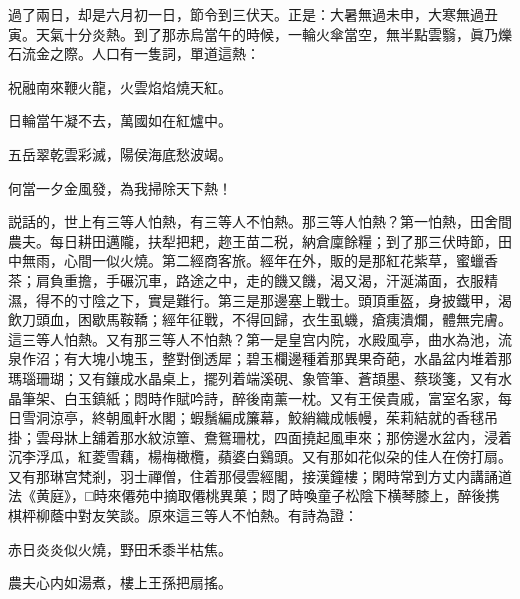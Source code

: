 過了兩日，却是六月初一日，節令到三伏天。正是：大暑無過未申，大寒無過丑寅。天氣十分炎熱。到了那赤烏當午的時候，一輪火傘當空，無半點雲翳，眞乃爍石流金之際。人口有一隻詞，單道這熱：

\begin{myquote}
祝融南來鞭火龍，火雲焰焰燒天紅。

日輪當午凝不去，萬國如在紅爐中。

五岳翠乾雲彩滅，陽侯海底愁波竭。

何當一夕金風發，為我掃除天下熱！
\end{myquote}

説話的，世上有三等人怕熱，有三等人不怕熱。那三等人怕熱？第一怕熱，田舍間農夫。每日耕田邁隴，扶犁把耙，趂王苗二税，納倉廩餘糧；到了那三伏時節，田中無雨，心間一似火燒。第二經商客旅。經年在外，販的是那紅花紫草，蜜蠟香茶；肩負重擔，手碾沉車，路途之中，走的饑又饑，渴又渴，汗涎滿面，衣服精濕，得不的寸陰之下，實是難行。第三是那邊塞上戰士。頭頂重盔，身披鐵甲，渴飲刀頭血，困歇馬鞍鞽；經年征戰，不得回歸，衣生虱蟣，瘡痍潰爛，體無完膚。這三等人怕熱。又有那三等人不怕熱？第一是皇宫内院，水殿風亭，曲水為池，流泉作沼；有大塊小塊玉，整對倒透犀；碧玉欄邊種着那異果奇葩，水晶盆内堆着那瑪瑙珊瑚；又有鑲成水晶桌上，擺列着端溪硯、象管筆、蒼頡墨、蔡琰箋，又有水晶筆架、白玉鎮紙；悶時作賦吟詩，醉後南薰一枕。又有王侯貴戚，富室名家，每日雪洞涼亭，終朝風軒水閣；蝦鬚編成簾幕，鮫綃織成帳幔，茱莉結就的香毬吊掛；雲母牀上舖着那水紋涼簟、鴦鴛珊枕，四面撓起風車來；那傍邊水盆内，浸着沉李浮瓜，紅菱雪藕，楊梅橄欖，蘋婆白鷄頭。又有那如花似朶的佳人在傍打扇。又有那琳宫梵剎，羽士禪僧，住着那侵雲經閣，接漢鐘樓；閑時常到方丈内講誦道法《黄庭》，□時來僊苑中摘取僊桃異菓；悶了時喚童子松陰下横琴膝上，醉後携棋枰柳蔭中對友笑談。原來這三等人不怕熱。有詩為證：

\begin{myquote}
赤日炎炎似火燒，野田禾黍半枯焦。

農夫心内如湯煮，樓上王孫把扇搖。
\end{myquote}

